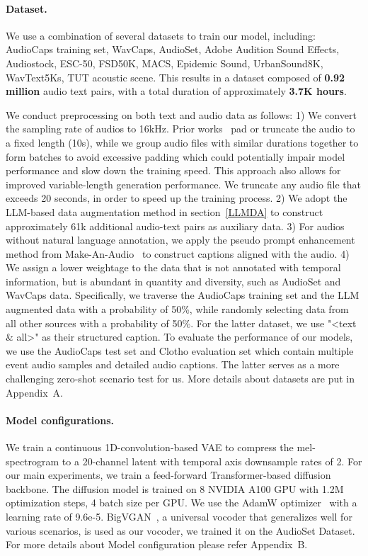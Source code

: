 \documentclass{article}
\begin{document}
\paragraph{Dataset.} \label{data}
We use a combination of several datasets to train our model, including: AudioCaps training set, WavCaps, AudioSet, Adobe Audition Sound Effects, Audiostock,  ESC-50, FSD50K, MACS, Epidemic Sound, UrbanSound8K, WavText5Ks, TUT acoustic scene. 
This results in a dataset composed of \textbf{0.92 million} audio text pairs, with a total duration of approximately \textbf{3.7K hours}.

We conduct preprocessing on both text and audio data as follows:
1) We convert the sampling rate of audios to 16kHz. Prior works~\cite{yangDiffsoundDiscreteDiffusion2023,huang2023makeanaudio,liuAudioLDMTexttoAudioGeneration2023} pad or truncate the audio to a fixed length (10s), while we group audio files with similar durations together to form batches to avoid excessive padding which could potentially impair model performance and slow down the training speed. This approach also allows for improved variable-length generation performance. We truncate any audio file that exceeds 20 seconds, in order to speed up the training process. 2) We adopt the LLM-based data augmentation method in section~\ref{LLMDA} to construct approximately 61k additional audio-text pairs as auxiliary data. 3) For audios without natural language annotation, we apply the pseudo prompt enhancement method from Make-An-Audio~\cite{huang2023makeanaudio} to construct captions aligned with the audio. 4) We assign a lower weightage to the data that is not annotated with temporal information, but is abundant in quantity and diversity, such as AudioSet and WavCaps data. Specifically, we traverse the AudioCaps training set and the LLM augmented data with a probability of 50\%, while randomly selecting data from all other sources with a probability of 50\%. For the latter dataset, we use "<text \& all>" as their structured caption. 
To evaluate the performance of our models, we use the AudioCaps test set and Clotho evaluation set which contain multiple event audio samples and detailed audio captions. The latter serves as a more challenging zero-shot scenario test for us. More details about datasets are put in Appendix~A.

\paragraph{Model configurations.}
We train a continuous 1D-convolution-based VAE to compress the mel-spectrogram to a 20-channel latent with temporal axis downsample rates of 2. For our main experiments, we train a feed-forward Transformer-based diffusion backbone. The diffusion model is trained on 8 NVIDIA A100 GPU with 1.2M optimization steps, 4 batch size per GPU. We use the AdamW optimizer~\cite{kingma2014adam} with a learning rate of 9.6e-5. BigVGAN~\cite{leeBigVGANUniversalNeural2023}, a universal vocoder that generalizes well for various scenarios, is used as our vocoder, we trained it on the AudioSet Dataset. For more details about Model configuration please refer Appendix~B.
\end{document}
